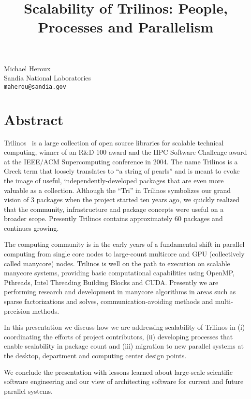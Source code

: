 \title{Scalability of Trilinos: People, Processes and Parallelism}
\author{} \institute{}
\maketitle

\begin{center}
{\large Michael Heroux}\\
Sandia National Laboratories\\
{\tt maherou@sandia.gov}
\end{center}

\section*{Abstract}
Trilinos~\cite{heroux1,heroux2} is a large collection of open source libraries for scalable technical computing, winner of an R\&D 100 award and the HPC Software Challenge award at the IEEE/ACM Supercomputing conference in 2004.  The name Trilinos is a Greek term that loosely translates to ``a string of pearls'' and is meant to evoke the image of useful, independently-developed packages that are even more valuable as a collection.  Although the ``Tri'' in Trilinos symbolizes our grand vision of 3 packages when the project started ten years ago, we quickly realized that the community, infrastructure and package concepts were useful on a broader scope.  Presently Trilinos contains approximately 60 packages and continues growing.  

The computing community is in the early years of a fundamental shift in parallel computing from single core nodes to large-count multicore and GPU (collectively called manycore) nodes.  Trilinos is well on the path to execution on scalable manycore systems, providing basic computational capabilities using OpenMP, Pthreads, Intel Threading Building Blocks and CUDA.  Presently we are performing research and development in manycore algorithms in areas such as sparse factorizations and solves, communication-avoiding methods and multi-precision methods.

In this presentation we discuss how we are addressing scalability of Trilinos in (i) coordinating the efforts of project contributors, (ii) developing processes that enable scalability in package count and (iii) migration to new parallel systems at the desktop, department and computing center design points.

We conclude the presentation with lessons learned about large-scale scientific software engineering and our view of architecting software for current and future parallel systems.

